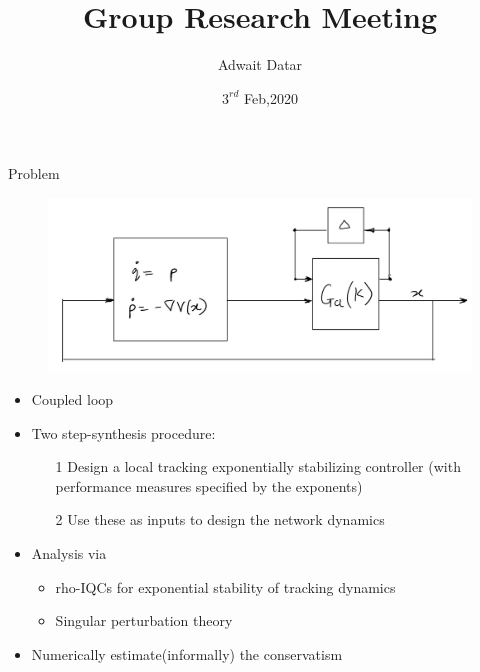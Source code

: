 \documentclass{beamer}
\title[Spectral Graph Theory Applications]{Group Research Meeting}
\author{Adwait Datar}
\institute{Technical University of Hamburg}
\date{$3^{rd}$ Feb,2020}
\begin{document}
\begin{frame}	
  \titlepage
\end{frame}


\begin{frame}{Problem}	
\begin{figure}
	\includegraphics[width=1.0\linewidth]{figures/coupled_arch.JPG}
	\label{fig:mjlstraj}
\end{figure}
\begin{itemize}
	\item Coupled loop
	\item Two step-synthesis procedure:
	\begin{itemize}
		\item[1] Design a local tracking exponentially stabilizing controller (with performance measures specified by the exponents)
		\item[2] Use these as inputs to design the network dynamics
	\end{itemize}
	\item Analysis via
	\begin{itemize}
		\item rho-IQCs for exponential stability of tracking dynamics
		\item Singular perturbation theory
	\end{itemize}
	\item Numerically estimate(informally) the conservatism
\end{itemize}
\end{frame}
\end{document}
